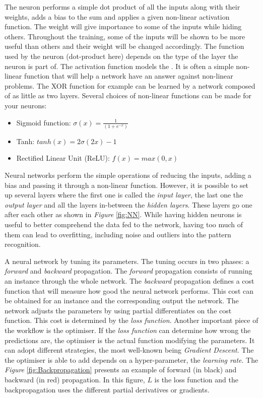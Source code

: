 The neuron performs a simple dot product of all the inputs along with their weights, adds a bias to the sum and applies a given non-linear activation function. The weight will give importance to some of the inputs while hiding others. Throughout the training, some of the inputs will be shown to be more useful than others and their weight will be changed accordingly. The function used by the neuron (dot-product here) depends on the type of the layer the neuron is part of. The activation function models the . It is often a simple non-linear function that will help a network have an answer against non-linear problems. The XOR function for example can be learned by a network composed of as little as two layers. Several choices of non-linear functions can be made for your neurons:
\begin{itemize}
  \item Sigmoid function: $\sigma(x) = \frac{1}{(1+e^{-x})}$
  \item Tanh: $tanh(x) = 2\sigma(2x) - 1$
  \item Rectified Linear Unit (ReLU): $ f(x) = max(0,x) $
\end{itemize}

Neural networks perform the simple operations of reducing the inputs, adding a bias and passing it through a non-linear function. However, it is possible to set up several layers where the first one is called the \emph{input layer}, the last one the \emph{output layer} and all the layers in-between the \emph{hidden layers}. These layers go one after each other as shown in \emph{Figure} \ref{fig:NN}. While having hidden neurons is useful to better comprehend the data fed to the network, having too much of them can lead to overfitting, including noise and outliers into the pattern recognition.

A neural network  by tuning its parameters. The tuning occurs in two phases: a \emph{forward} and \emph{backward} propagation. The \emph{forward} propagation consists of running an instance through the whole network. The \emph{backward} propagation defines a cost function that will measure how good the neural network performs. This cost can be obtained for an instance and the corresponding output the network. The network adjusts the parameters by using partial differentiates on the cost function. This cost is determined by the \emph{loss function}. Another important piece of the workflow is the optimiser. If the \emph{loss function} can determine how wrong the predictions are, the optimiser is the actual function modifying the parameters. It can adopt different strategies, the most well-known being \emph{Gradient Descent}. The  the optimiser is able to add depends on a hyper-parameter, the \emph{learning rate}. The \emph{Figure} \ref{fig:Backpropagation} presents an example of forward (in black) and backward (in red) propagation. In this figure, $L$ is the loss function and the backpropagation uses the different partial derivatives or gradients.

